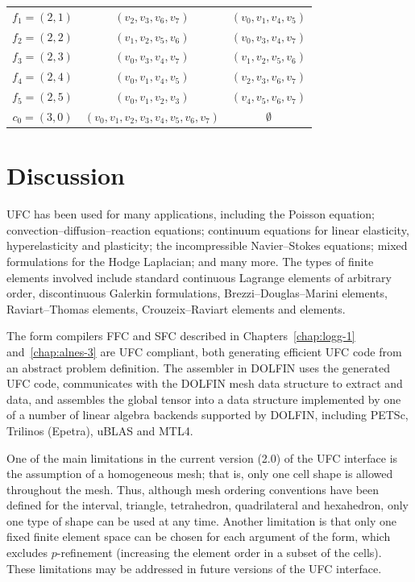 \begin{center}
\begin{tabular}{ccc}
    $f_1 = (2, 1)$ & $(v_2, v_3, v_6, v_7)$ & $(v_0, v_1, v_4, v_5)$ \\
    $f_2 = (2, 2)$ & $(v_1, v_2, v_5, v_6)$ & $(v_0, v_3, v_4, v_7)$ \\
    $f_3 = (2, 3)$ & $(v_0, v_3, v_4, v_7)$ & $(v_1, v_2, v_5, v_6)$ \\
    $f_4 = (2, 4)$ & $(v_0, v_1, v_4, v_5)$ & $(v_2, v_3, v_6, v_7)$ \\
    $f_5 = (2, 5)$ & $(v_0, v_1, v_2, v_3)$ & $(v_4, v_5, v_6, v_7)$ \\
    $c_0 = (3, 0)$ & $(v_0, v_1, v_2, v_3, v_4, v_5, v_6, v_7)$ & $\emptyset$ \\
    \toprule
  \end{tabular}
\end{center}


\section{Discussion}

UFC has been used for many applications, including the Poisson
equation; convection--diffusion--reaction equations; continuum
equations for linear elasticity, hyperelasticity and plasticity; the
incompressible Navier--Stokes equations; mixed formulations for the
Hodge Laplacian; and many more. The types of finite elements involved
include standard continuous Lagrange elements of arbitrary order,
discontinuous Galerkin formulations, Brezzi--Douglas--Marini elements,
Raviart--Thomas elements, Crouzeix--Raviart elements and \nedelec{}
elements.

The form compilers FFC and SFC described in Chapters~\ref{chap:logg-1}
and~\ref{chap:alnes-3} are UFC compliant, both generating efficient
UFC code from an abstract problem definition. The assembler in DOLFIN
uses the generated UFC code, communicates with the DOLFIN mesh data
structure to extract  and  data, and
assembles the global tensor into a data structure implemented by one
of a number of linear algebra backends supported by DOLFIN, including
PETSc, Trilinos (Epetra), uBLAS and MTL4.

One of the main limitations in the current version (2.0) of the UFC
interface is the assumption of a homogeneous mesh; that is, only one
cell shape is allowed throughout the mesh. Thus, although mesh
ordering conventions have been defined for the interval, triangle,
tetrahedron, quadrilateral and hexahedron, only one type of shape can
be used at any time. Another limitation is that only one fixed finite
element space can be chosen for each argument of the form, which
excludes $p$-refinement (increasing the element order in a subset of
the cells). These limitations may be addressed in future versions of
the UFC interface.

